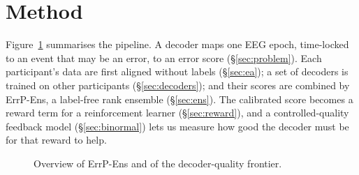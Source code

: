 \section{Method}
\label{sec:method}

Figure~\ref{fig:overview} summarises the pipeline. A decoder maps one EEG epoch, time-locked to an event that
may be an error, to an error score (\S\ref{sec:problem}). Each participant's data are first aligned without
labels (\S\ref{sec:ea}); a set of decoders is trained on other participants (\S\ref{sec:decoders}); and their
scores are combined by ErrP-Ens, a label-free rank ensemble (\S\ref{sec:ens}). The calibrated score becomes a
reward term for a reinforcement learner (\S\ref{sec:reward}), and a controlled-quality feedback model
(\S\ref{sec:binormal}) lets us measure how good the decoder must be for that reward to help.

\begin{figure}[t]
\centering
{}
\caption{Overview of ErrP-Ens and of the decoder-quality frontier.}
\label{fig:overview}
\end{figure}

